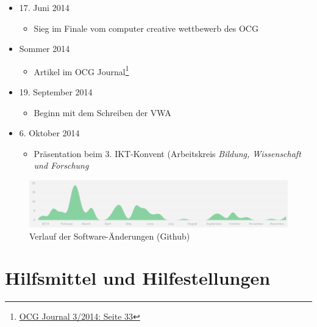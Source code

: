 \documentclass[12pt,a4paper,oneside]{scrartcl}
\begin{document}
\begin{itemize}
\begin{itemize}
		\item Präsentation bei den \textsf{EDU|days}\footnote{\href{http://www.edudays.at/}{www.edudays.at}}
	\end{itemize}
	\item 17. Juni 2014
	\begin{itemize}
		\item Sieg im Finale vom \textsf{computer creative wettbewerb} des OCG
	\end{itemize}
	\item Sommer 2014
	\begin{itemize}
		\item Artikel im OCG Journal\footnote{\href{http://www.ocg.at/sites/ocg.at/files/medien/pdfs/OCG-Journal1403.pdf}{OCG Journal 3/2014: Seite 33}}
	\end{itemize}
	\item 19. September 2014
	\begin{itemize}
		\item Beginn mit dem Schreiben der VWA
	\end{itemize}
	\item 6. Oktober 2014
	\begin{itemize}
		\item Präsentation beim 3. IKT-Konvent (Arbeitskreis \emph{Bildung, Wissenschaft und Forschung}
	\end{itemize}

\end{itemize}

\begin{figure}[h]
  \centering
     \includegraphics[width=\textwidth]{figures/github_verlauf}
  \caption*{Verlauf der Software-Änderungen (Github)}
  \label{fig:github}
\end{figure}

\section{Hilfsmittel und Hilfestellungen}
\lipsum[1]
\end{document}

